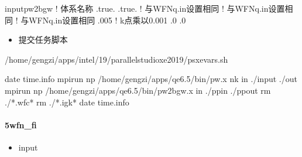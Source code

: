 \documentclass[a4paper,12pt,english]{sphinxmanual}
\begin{document}
\begin{sphinxVerbatim}[commandchars=\\\{\}]
input\PYGZus{}pw2bgw
                  ! 体系名称
     
     .true.
     
     .true.
                   ! 与WFNq.in设置相同
                   ! 与WFNq.in设置相同
                   ! 与WFNq.in设置相同
     .005          ! k点乘以0.001
     .0
     .0
\end{sphinxVerbatim}
\begin{itemize}
\item {} 
\sphinxAtStartPar
提交任务脚本

\end{itemize}

\begin{sphinxVerbatim}[commandchars=\\\{\}]


 
 /home/gengzi/apps/intel/19/parallel\PYGZus{}studio\PYGZus{}xe\PYGZus{}2019/psxevars.sh

date  \PYGZgt{}\PYGZgt{} time.info
mpirun \PYGZhy{}np  /home/gengzi/apps/qe\PYGZhy{}6.5/bin/pw.x \PYGZhy{}nk   \PYGZhy{}in ./input \PYGZgt{} ./out
mpirun \PYGZhy{}np  /home/gengzi/apps/qe\PYGZhy{}6.5/bin/pw2bgw.x \PYGZhy{}in ./pp\PYGZus{}in \PYGZgt{} ./pp\PYGZus{}out
rm ./*.wfc*
rm ./*.igk*
date  \PYGZgt{}\PYGZgt{} time.info
\end{sphinxVerbatim}


\paragraph{5\sphinxhyphen{}wfn\_fi}
\label{\detokenize{tutorials/berkeleygw/gw:wfn-fi}}\begin{itemize}
\item {} 
\sphinxAtStartPar
input

\end{itemize}
\end{document}
